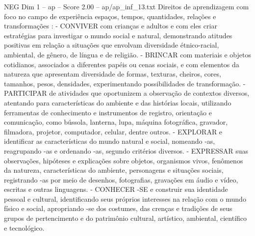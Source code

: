 \begin{textsample}{NEG Dim 1 – ap – Score 2.00 – ap/ap\_inf\_13.txt}
Direitos de aprendizagem com foco no campo de experiência espaços, tempos, quantidades, relações e transformações : - CONVIVER com crianças e adultos e com eles criar estratégias para investigar o mundo social e natural, demonstrando atitudes positivas em relação a situações que envolvam diversidade étnico-racial, ambiental, de gênero, de língua e de religião. - BRINCAR com materiais e objetos cotidianos, associados a diferentes papéis ou cenas sociais, e com elementos da natureza que apresentam diversidade de formas, texturas, cheiros, cores, tamanhos, pesos, densidades, experimentando possibilidades de transformação. - PARTICIPAR de atividades que oportunizem a observação de contextos diversos, atentando para características do ambiente e das histórias locais, utilizando ferramentas de conhecimento e instrumentos de registro, orientação e comunicação, como bússola, lanterna, lupa, máquina fotográfica, gravador, filmadora, projetor, computador, celular, dentre outros. - EXPLORAR e identificar as características do mundo natural e social, nomeando -as, reagrupando -as e ordenando -as, segundo critérios diversos. - EXPRESSAR suas observações, hipóteses e explicações sobre objetos, organismos vivos, fenômenos da natureza, características do ambiente, personagens e situações sociais, registrando -as por meio de desenhos, fotografias, gravações em áudio e vídeo, escritas e outras linguagens. - CONHECER -SE e construir sua identidade pessoal e cultural, identificando seus próprios interesses na relação com o mundo físico e social, apropriando -se dos costumes, das crenças e tradições de seus grupos de pertencimento e do patrimônio cultural, artístico, ambiental, científico e tecnológico.

\end{textsample}
